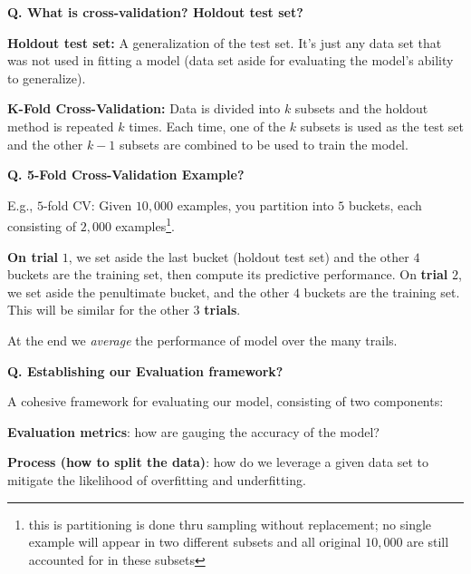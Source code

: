\begin{frame}[fragile]{\textbf{Q. What is cross-validation? Holdout test set?}}
  \begin{wideitemize}
    \item \textbf{Holdout test set:} A generalization of the test set. It's just any data set
    that was not used in fitting a model (data set aside for evaluating the model's ability to generalize).
    \item \textbf{K-Fold Cross-Validation:} Data is divided into $k$ subsets and the holdout method
    is repeated $k$ times. Each time, one of the $k$ subsets is used as the test set and the other
    $k - 1$ subsets are combined to be used to train the model.
  \end{wideitemize}
\end{frame}


\begin{frame}[fragile]{\textbf{Q. 5-Fold Cross-Validation Example?}}
  \begin{wideitemize}
    \item E.g., $5$-fold CV: Given $10,000$ examples, you partition into $5$ buckets, each consisting
    of $2,000$ examples\footnote{this is partitioning is done thru sampling without replacement; no
    single example will appear in two different subsets and all original $10,000$ are still
    accounted for in these subsets}.
    \item \textbf{On trial} $1$, we set aside the last bucket (holdout test set) and the other $4$ buckets are the
    training set, then compute its predictive performance. On \textbf{trial} $2$, we set aside the penultimate
    bucket, and the other $4$ buckets are the training set. This will be similar for the other $3$ \textbf{trials}.
    \item At the end we \textit{average} the performance of model over the many trails.
  \end{wideitemize}
\end{frame}

\begin{frame}[fragile]{\textbf{Q. Establishing our Evaluation framework?}}
  \begin{wideitemize}
    \item A cohesive framework for evaluating our model, consisting of two components:\medskip
    \begin{wideitemize}
      \item \textbf{Evaluation metrics}: how are gauging the accuracy of the model?
      \item \textbf{Process (how to split the data)}: how do we leverage a given
      data set to mitigate the likelihood of overfitting and underfitting.
    \end{wideitemize}
  \end{wideitemize}
\end{frame}

